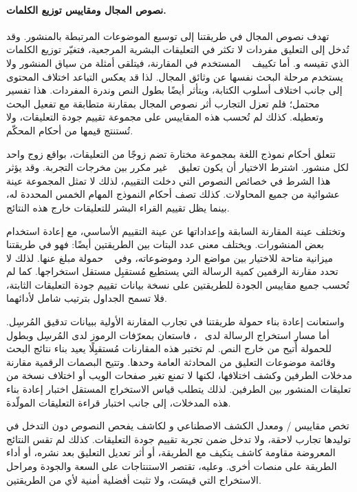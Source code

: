 \paragraph{نصوص المجال ومقاييس توزيع الكلمات.}
\label{par:baseline-domain-vocabulary}
تهدف نصوص المجال في طريقتنا إلى توسيع الموضوعات المرتبطة بالمنشور. وقد تُدخل إلى التعليق مفردات لا تكثر في التعليقات البشرية المرجعية، فتغيّر توزيع الكلمات الذي تقيسه  و. أما تكييف ~\cite{lin2024zero} المستخدم في المقارنة، فيتلقى أمثلة من سياق المنشور ولا يستخدم مرحلة البحث نفسها عن وثائق المجال. لذا قد يعكس التباعد اختلاف المحتوى إلى جانب اختلاف أسلوب الكتابة، ويتأثر أيضًا بطول النص وندرة المفردات. هذا تفسير محتمل؛ فلم تعزل التجارب أثر نصوص المجال بمقارنة متطابقة مع تفعيل البحث وتعطيله. كذلك لم تُحسب هذه المقاييس على مجموعة تقييم جودة التعليقات، ولا تُستنتج قيمها من أحكام المحكّم.

تتعلق أحكام نموذج اللغة بمجموعة مختارة تضم  زوجًا من التعليقات، بواقع زوج واحد لكل منشور. اشترط الاختيار أن يكون تعليق ~\cite{lin2024zero} غير مكرر بين مخرجات التجربة. وقد يؤثر هذا الشرط في خصائص النصوص التي دخلت التقييم، لذلك لا تمثل المجموعة عينة عشوائية من جميع المحاولات. كذلك تصف أحكام النموذج المهام الخمس المحددة له، بينما يظل تقييم القراء البشر للتعليقات خارج هذه النتائج.

وتختلف عينة المقارنة السابقة وإعداداتها عن عينة التقييم الأساسي، مع إعادة استخدام بعض المنشورات. ويختلف معنى عدد البتات بين الطريقتين أيضًا: فهو في طريقتنا ميزانية متاحة للاختيار بين مواضع الرد وموضوعاته، وفي ~\cite{lin2024zero} حمولة مبلغ عنها. لذلك لا تحدد مقارنة الرقمين كمية الرسالة التي يستطيع مُستقبِل مستقل استخراجها. كما لم تُحسب جميع مقاييس الجودة للطريقتين على نسخة بيانات تقييم جودة التعليقات الثابتة، فلا تسمح الجداول بترتيب شامل لأدائهما.

واستعانت إعادة بناء حمولة طريقتنا في تجارب المقارنة الأولية ببيانات تدقيق المُرسِل. أما مسار استخراج الرسالة لدى ~\cite{lin2024zero}، فاستعان بمعرّفات الرموز لدى المُرسِل وبطول للحمولة أُتيح من خارج النص. لم تختبر هذه المقارنات مُستقبِلًا يعيد بناء نتائج البحث وقائمة موضوعات التعليق من المحادثة العامة وحدها. وتتيح البصمات الرقمية مقارنة مدخلات الطرفين وكشف اختلافها، لكنها لا تمنع تغير صفحات الويب أو اختلاف نسخة من تعليقات المنشور بين الطرفين. لذلك يتطلب قياس الاستخراج المستقل اختبار إعادة بناء هذه المدخلات، إلى جانب اختبار قراءة التعليقات المولّدة.

تخص مقاييس / ومعدل الكشف الاصطناعي و لكاشف يفحص النصوص دون التدخل في توليدها تجارب لاحقة، ولا تدخل ضمن تجربة تقييم جودة التعليقات. كذلك لم تقس النتائج المعروضة مقاومة كاشف يتكيف مع الطريقة، أو أثر تعديل التعليق بعد نشره، أو أداء الطريقة على منصات أخرى. وعليه، تقتصر الاستنتاجات على السعة والجودة ومراحل الاستخراج التي قيسَت، ولا تثبت أفضلية أمنية لأي من الطريقتين.
\FloatBarrier
